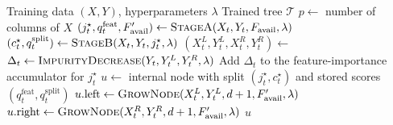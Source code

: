 \begin{algorithm}[tb]
  \caption{Conditional inference tree training skeleton (Stage~A $\rightarrow$ Stage~B)}
  \label{alg:citree}
  \begin{algorithmic}[1]
    \Require Training data $(X,Y)$, hyperparameters $\lambda$
    \Ensure Trained tree $\mathcal{T}$
    \State $p \gets$ number of columns of $X$
    \State \Return {}
        \State \Return {}
      \EndIf
      \State $(j_t^\star, q_t^{\mathrm{feat}}, F'_{\mathrm{avail}}) \gets \Call{StageA}{X_t,Y_t,F_{\mathrm{avail}},\lambda}$
        \State \Return {}
      \EndIf
      \State $(c_t^\star, q_t^{\mathrm{split}}) \gets \Call{StageB}{X_t,Y_t,j_t^\star,\lambda}$
        \State \Return {}
      \EndIf
      \State $(X_t^L,Y_t^L,X_t^R,Y_t^R) \gets$ 
      \State $\Delta_t \gets \Call{ImpurityDecrease}{Y_t,Y_t^L,Y_t^R,\lambda}$
        \State \Return {}
      \EndIf
      \State Add $\Delta_t$ to the feature-importance accumulator for $j_t^\star$
      \State $u \gets$ internal node with split $(j_t^\star,c_t^\star)$ and stored scores $(q_t^{\mathrm{feat}},q_t^{\mathrm{split}})$
      \State $u.\mathrm{left} \gets \Call{GrowNode}{X_t^L,Y_t^L,d+1,F'_{\mathrm{avail}},\lambda}$
      \State $u.\mathrm{right} \gets \Call{GrowNode}{X_t^R,Y_t^R,d+1,F'_{\mathrm{avail}},\lambda}$
      \State \Return $u$
    \EndFunction
  \end{algorithmic}
\end{algorithm}

